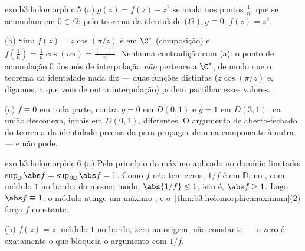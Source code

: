 \begin{solution}{exo:b3:holomorphic:5}
(a) $g(z) = f(z) - z^2$ se anula nos pontos $\frac1n$,
que se acumulam em $0 \in \Omega$: pelo teorema da identidade
($\Omega$ ), $g \equiv 0$: $f(z) = z^2$.

(b) Sim: $f(z) = z\cos(\pi/z)$ é  em $\C^*$
(composição) e $f(\frac1n) = \frac1n\cos(n\pi) =
\frac{(-1)^n}n$. Nenhuma contradição com (a): o ponto de acumulação
$0$ dos nós de interpolação \emph{não} pertence a
$\C^*$, de modo que o teorema da identidade nada diz --- duas funções
distintas ($z\cos(\pi/z)$ e, digamos, a que vem de outra
interpolação) podem partilhar esses valores.

(c) $f \equiv 0$ em toda parte, contra $g = 0$ em $D(0,1)$ e
$g = 1$ em $D(3,1)$:  na união desconexa,
iguais em $D(0,1)$, diferentes. O argumento de aberto-fechado do
teorema da identidade precisa da  para propagar de uma
componente à outra --- e não pode.
\end{solution}

\begin{solution}{exo:b3:holomorphic:6}
(a) Pelo princípio do máximo aplicado no domínio limitado:
$\sup_{\mathbb D}\abs f = \sup_{\partial\mathbb D}\abs f = 1$.
Como $f$ não tem zeros, $1/f$ é  em $\mathbb D$,
 no , com módulo $1$ no bordo: do mesmo modo,
$\abs{1/f} \leq 1$, isto é, $\abs f \geq 1$. Logo $\abs f \equiv
1$: o módulo atinge um máximo , e o~\cref{thm:b3:holomorphic:maximum}(2) força $f$ constante.

(b) $f(z) = z$: módulo $1$ no bordo, zero na origem,
não constante --- o zero é exatamente o que bloqueia o argumento
com $1/f$.
\end{solution}

